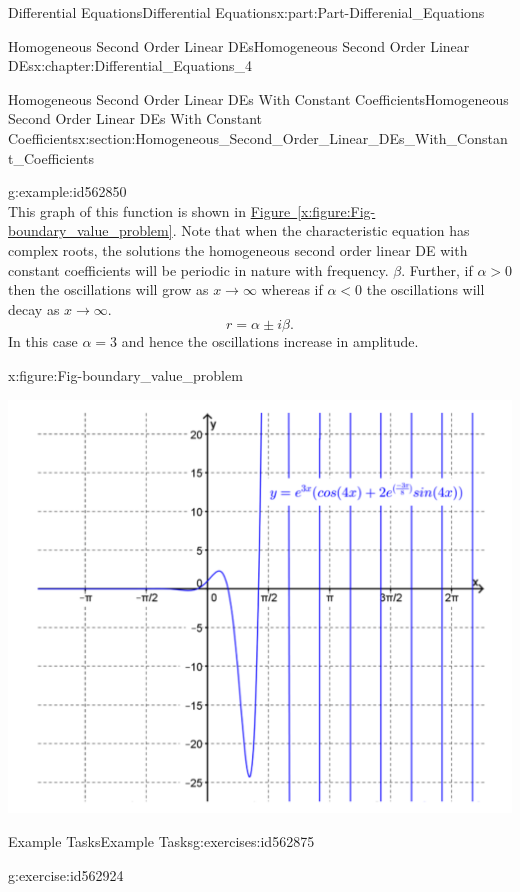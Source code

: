 \documentclass[oneside,10pt,]{book}
\newcommand{\xreffont}{\relax}
\numberwithin{equation}{section}
\begin{document}
\begin{partptx}{Differential Equations}{}{Differential Equations}{}{}{x:part:Part-Differenial_Equations}
\begin{chapterptx}{Homogeneous Second Order Linear DEs}{}{Homogeneous Second Order Linear DEs}{}{}{x:chapter:Differential_Equations_4}
\begin{sectionptx}{Homogeneous Second Order Linear DEs With Constant Coefficients}{}{Homogeneous Second Order Linear DEs With Constant Coefficients}{}{}{x:section:Homogeneous_Second_Order_Linear_DEs_With_Constant_Coefficients}
\begin{example}{}{g:example:id562850}
\begin{equation*}
\end{equation*}
This graph of this function is shown in \hyperref[x:figure:Fig-boundary_value_problem]{Figure~{\xreffont\ref{x:figure:Fig-boundary_value_problem}}}. Note that when the characteristic equation has complex roots, the solutions the homogeneous second order linear DE with constant coefficients will be periodic in nature with frequency. \(\beta.\) Further, if \(\alpha > 0\) then the oscillations will grow as \(x\to \infty \)  whereas if \(\alpha < 0\) the oscillations will decay as  \(x\to \infty. \)%
\begin{equation*}
r=\alpha \pm i \beta. 
\end{equation*}
In this case \(\alpha =3\) and hence the oscillations increase in amplitude. \begin{figureptx}{}{x:figure:Fig-boundary_value_problem}{}%
\begin{image}{0.075}{0.85}{0.075}%
\includegraphics[width=\linewidth]{./DifferentialEquations/Images/4/boundary_value_problem.png}
\end{image}%
\tcblower
\end{figureptx}%
\end{example}
%
%
\typeout{************************************************}
\typeout{************************************************}
%
\begin{exercises-subsection-numberless}{Example Tasks}{}{Example Tasks}{}{}{g:exercises:id562875}
\begin{divisionexercise}{1}{}{}{g:exercise:id562924}%

\end{divisionexercise}
\end{exercises-subsection-numberless}
\end{sectionptx}
\end{chapterptx}
\end{partptx}
\end{document}
